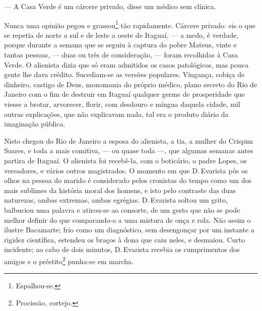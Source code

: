 --- A Casa Verde é um cárcere privado, disse um médico sem clínica.

Nunca uma opinião pegou e grassou\footnote{Espalhou-se.} tão
rapidamente. Cárcere privado: eis o que se repetia de norte a sul e de
leste a oeste de Itaguaí, --- a medo, é verdade, porque durante a semana
que se seguiu à captura do pobre Mateus, vinte e tantas pessoas, ---
duas ou três de consideração, --- foram recolhidas à Casa Verde. O
alienista dizia que só eram admitidos os casos patológicos, mas pouca
gente lhe dava crédito. Sucediam-se as versões populares. Vingança,
cobiça de dinheiro, castigo de Deus, monomania do próprio médico, plano
secreto do Rio de Janeiro com o fim de destruir em Itaguaí qualquer
germe de prosperidade que viesse a brotar, arvorecer, florir, com
desdouro e míngua daquela cidade, mil outras explicações, que não
explicavam nada, tal era o produto diário da imaginação pública.

Nisto chegou do Rio de Janeiro a esposa do alienista, a tia, a mulher do
Crispim Soares, e toda a mais comitiva, --- ou quase toda ---, que
algumas semanas antes partira de Itaguaí. O alienista foi recebê-la, com
o boticário, o padre Lopes, os vereadores, e vários outros magistrados.
O momento em que D.\,Evarista pôs os olhos na pessoa do marido é
considerado pelos cronistas do tempo como um dos mais sublimes da
história moral dos homens, e isto pelo contraste das duas naturezas,
ambas extremas, ambas egrégias. D.\,Evarista soltou um grito, balbuciou
uma palavra e atirou-se ao consorte, de um gesto que não se pode melhor
definir do que comparando-o a uma mistura de onça e rola. Não assim o
ilustre Bacamarte; frio como um diagnóstico, sem desengonçar por um
instante a rigidez científica, estendeu os braços à dona que caiu neles,
e desmaiou. Curto incidente; ao cabo de dois minutos, D.\,Evarista
recebia os cumprimentos dos amigos e o préstito\footnote{Procissão,
  cortejo.} punha-se em marcha.


